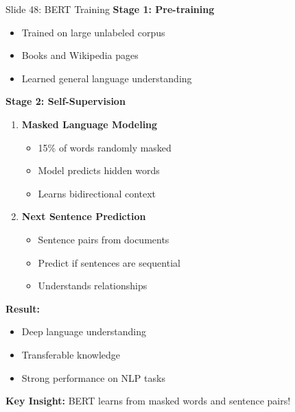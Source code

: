 \documentclass[8pt]{beamer}
\begin{document}
	\begin{frame}{Slide 48: BERT Training}
		\fontsize{6.5}{7.5}\selectfont
		\textbf{Stage 1: Pre-training}
		\begin{itemize}
			\item Trained on large unlabeled corpus
			\item Books and Wikipedia pages
			\item Learned general language understanding
		\end{itemize}
		
		\vspace{0.1cm}
		\textbf{Stage 2: Self-Supervision}
		\begin{enumerate}
			\item \textbf{Masked Language Modeling}
			\begin{itemize}
				\item 15\% of words randomly masked
				\item Model predicts hidden words
				\item Learns bidirectional context
			\end{itemize}
			\item \textbf{Next Sentence Prediction}
			\begin{itemize}
				\item Sentence pairs from documents
				\item Predict if sentences are sequential
				\item Understands relationships
			\end{itemize}
		\end{enumerate}
		
		\vspace{0.1cm}
		\textbf{Result:}
		\begin{itemize}
			\item Deep language understanding
			\item Transferable knowledge
			\item Strong performance on NLP tasks
		\end{itemize}
		
		\textcolor{myblue}{\textbf{Key Insight:}} BERT learns from masked words and sentence pairs!
	\end{frame}
	
\end{document}
